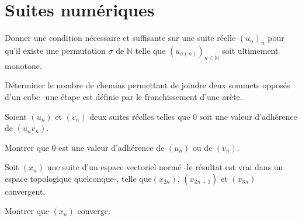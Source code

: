 \section{Suites numériques}

\begin{exer}
Donner une condition nécessaire et suffisante sur une suite réelle $(u_n)_n$ pour qu'il existe %
une permutation $\sigma$ de $\mathbb{N}$ telle que $(u_{\sigma (n)})_{n \in \mathbb{N}}$ soit ultimement monotone.
\end{exer}

\begin{exer}
Déterminer le nombre de chemins permettant de joindre deux sommets opposés d'un cube %
-une étape est définie par le franchissement d'une arète.
\end{exer}

\begin{exer}
Soient $(u_n)$ et $(v_n)$ deux suites réelles telles que $0$ soit une valeur d'adhérence de $(u_n v_n)$.

Montrer que $0$ est une valeur d'adhérence de $(u_n)$ ou de $(v_n)$.
\end{exer}

\begin{exer}
Soit $(x_n)$ une suite d'un espace vectoriel normé -le résultat est vrai dans un espace topologique quelconque-, %
telle que$(x_{2n})$, $(x_{2n+1})$ et $(x_{3n})$ convergent.

Montrer que $(x_n)$ converge.
\end{exer}
